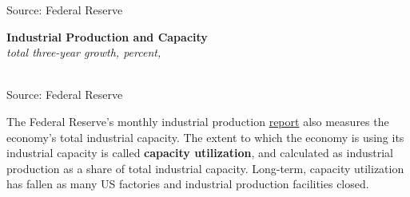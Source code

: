 \documentclass{report}
\newcommand{\tbllink}[1]{\href{https://raw.githubusercontent.com/bdecon/US-chartbook/master/chartbook/data/#1}{\faTable}}
\newcommand{\barylab}[2]{yticklabel style={text width=#1, align=right, 
		style={black!70}, text height=#2},}
\newcommand{\bbar}[2]{extra #1 ticks = {{#2}}, extra #1 tick labels = ,
		extra #1 tick style = {grid=major, grid style={thick, black!25}},}
\newcommand{\barplotnogrid}{xbar=0pt, axis line style={draw=none},
	    yticklabel style={align=left, anchor=east},
      		xmajorticks=false, ymajorgrids=false,   
	    ytick=data, tickwidth=0pt, area legend, reverse legend,
	    nodes near coords, nodes near coords align={horizontal},}
\begin{document}
{{{{{{\begin{minipage}{0.76\textwidth}
\footnotesize{Source: Federal Reserve} \hfill \tbllink{indprogr_rec.csv}

\end{minipage}

\newpage

\begin{minipage}{0.31\textwidth}
\small 

\end{minipage} \hspace{5mm}
\begin{minipage}{0.4\textwidth}
\noindent \normalsize \textbf{Industrial Production and Capacity}\\
\footnotesize{\textit{total three-year growth, percent, }}\\ 
\noindent \hspace*{-5mm} \\
\footnotesize{Source: Federal Reserve} \hfill \tbllink{ip_comp.csv}\\
\end{minipage}

\vspace{2mm}

\begin{minipage}{0.76\textwidth}

\small The Federal Reserve's monthly industrial production \href{https://www.federalreserve.gov/releases/g17/}{report} also measures the economy's total industrial capacity. The extent to which the economy is using its industrial capacity is called \textbf{capacity utilization}, and calculated as industrial production as a share of total industrial capacity. Long-term, capacity utilization has fallen as many US factories and industrial production facilities closed. \\


\end{minipage}}}}}}}
\end{document}

